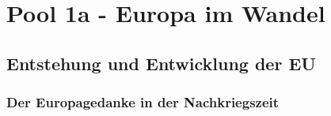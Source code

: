 \documentclass[letterpaper, 12pt]{article}
\let\tempsection\section
\renewcommand\section[1]{\vspace{-0.3cm}\tempsection{#1}\vspace{-0.3cm}}
\let\tempsubsection\subsection
\renewcommand\subsection[1]{\vspace{0cm}\tempsubsection{#1}\vspace{0cm}}
\let\tempsubsubsection\subsubsection
\renewcommand\subsubsection[1]{\vspace{0cm}\tempsubsubsection{#1}\vspace{0cm}}
\begin{document}
\parindent 0pt
\parskip 6pt



\clearpage
\thispagestyle{empty}
\tableofcontents

\newpage
{}
\pagestyle{fancy}


\section{Pool 1a - Europa im Wandel \cite{buch}}

\subsection{Entstehung und Entwicklung der EU}

\subsubsection{Der Europagedanke in der Nachkriegszeit}
\end{document}
